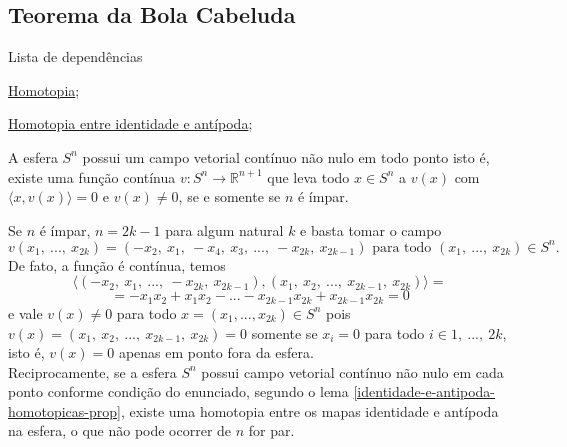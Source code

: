 \subsection{Teorema da Bola Cabeluda} %
\label{teorema-bola-cabeluda-prop}
\begin{titlemize}{Lista de dependências}
	\item \hyperref[homotopia-def]{Homotopia};\\ %
	\item \hyperref[identidade-e-antipoda-homotopicas-prop]{Homotopia entre identidade e antípoda};\\
\end{titlemize}


\begin{thm}[Teorema da Bola Cabeluda]%
	A esfera $S^n$ possui um campo vetorial contínuo não nulo em todo ponto isto é, existe uma função contínua $v:S^n\rightarrow \mathbb{R}^{n+1}$ que leva todo $x\in S^n$ a $v(x)$ com $\langle x, v(x) \rangle =0$ e $v(x)\ne 0$, se e somente se $n$ é ímpar.\\
\end{thm}
\begin{dem}
    Se $n$ é ímpar, $n=2k-1$ para algum natural $k$ e basta tomar o campo $$v(x_1,~...,~x_{2k})=(-x_2,~x_1,~-x_4,~x_3,~...,~-x_{2k},~x_{2k-1})\text{ para todo }(x_1,~...,~x_{2k})\in S^n.$$
    De fato, a função é contínua, temos $$\langle(-x_2,~x_1,~...,~-x_{2k},~x_{2k-1}), (x_1,~x_2,~...,~x_{2k-1},~x_{2k}) \rangle =$$$$=-x_1x_2+x_1x_2-...-x_{2k-1}x_{2k}+x_{2k-1}x_{2k}=0$$ e vale $v(x)\ne 0$ para todo $x=(x_1,...,x_{2k})\in S^n$ pois $v(x)=(x_1,~x_2,~...,~x_{2k-1},~x_{2k})=0$ somente se $x_i=0$ para todo $i\in {1,~...,~2k}$, isto é, $v(x)=0$ apenas em ponto fora da esfera.\\

    Reciprocamente, se a esfera $S^n$ possui campo vetorial contínuo não nulo em cada ponto conforme condição do enunciado, segundo o lema \ref{identidade-e-antipoda-homotopicas-prop}, existe uma homotopia entre os mapas identidade e antípoda na esfera, o que não pode ocorrer de $n$ for par.

    
\end{dem}

